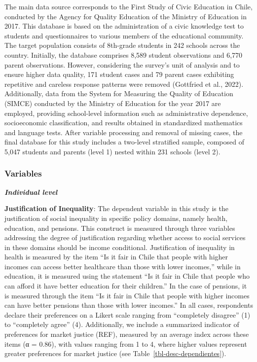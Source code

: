 \documentclass[
  letterpaper,
  DIV=11,
  numbers=noendperiod]{scrartcl}
\begin{document}
The main data source corresponds to the First Study of Civic Education
in Chile, conducted by the Agency for Quality Education of the Ministry
of Education in 2017. This database is based on the administration of a
civic knowledge test to students and questionnaires to various members
of the educational community. The target population consists of
8th-grade students in 242 schools across the country. Initially, the
database comprises 8,589 student observations and 6,770 parent
observations. However, considering the survey's unit of analysis and to
ensure higher data quality, 171 student cases and 79 parent cases
exhibiting repetitive and careless response patterns were removed
(Gottfried et al., 2022). Additionally, data from the System for
Measuring the Quality of Education (SIMCE) conducted by the Ministry of
Education for the year 2017 are employed, providing school-level
information such as administrative dependence, socioeconomic
classification, and results obtained in standardized mathematics and
language tests. After variable processing and removal of missing cases,
the final database for this study includes a two-level stratified
sample, composed of 5,047 students and parents (level 1) nested within
231 schools (level 2).

\hypertarget{variables}{%
\subsubsection{Variables}\label{variables}}

\textbf{\emph{Individual level}}

\textbf{Justification of Inequality}: The dependent variable in this
study is the justification of social inequality in specific policy
domains, namely health, education, and pensions. This construct is
measured through three variables addressing the degree of justification
regarding whether access to social services in these domains should be
income conditional. Justification of inequality in health is measured by
the item ``Is it fair in Chile that people with higher incomes can
access better healthcare than those with lower incomes,'' while in
education, it is measured using the statement ``Is it fair in Chile that
people who can afford it have better education for their children.'' In
the case of pensions, it is measured through the item ``Is it fair in
Chile that people with higher incomes can have better pensions than
those with lower incomes.'' In all cases, respondents declare their
preferences on a Likert scale ranging from ``completely disagree'' (1)
to ``completely agree'' (4). Additionally, we include a summarized
indicator of preferences for market justice (REF), measured by an
average index across these items (α = 0.86), with values ranging from 1
to 4, where higher values represent greater preferences for market
justice (see Table~\ref{tbl-desc-dependientes}).
\end{document}

